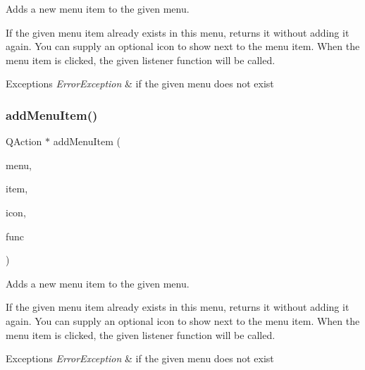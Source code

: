 Adds a new menu item to the given menu. 

If the given menu item already exists in this menu, returns it without adding it again. You can supply an optional icon to show next to the menu item. When the menu item is clicked, the given listener function will be called. 
\begin{DoxyExceptions}{Exceptions}
{\em Error\+Exception} & if the given menu does not exist \\
\hline
\end{DoxyExceptions}
\mbox{\label{classGWindow_a9c1d62659ac23b6752a59dc657c5140c}} 
\subsubsection{\texorpdfstring{add\+Menu\+Item()}{addMenuItem()}\hspace{0.1cm}{\footnotesize\ttfamily [3/4]}}
{\footnotesize\ttfamily Q\+Action $\ast$ add\+Menu\+Item (\begin{DoxyParamCaption}\item[{const std\+::string \&}]{menu,  }\item[{const std\+::string \&}]{item,  }\item[{const Q\+Icon \&}]{icon,  }\item[{G\+Event\+Listener\+Void}]{func }\end{DoxyParamCaption})\hspace{0.3cm}{\ttfamily [virtual]}}



Adds a new menu item to the given menu. 

If the given menu item already exists in this menu, returns it without adding it again. You can supply an optional icon to show next to the menu item. When the menu item is clicked, the given listener function will be called. 
\begin{DoxyExceptions}{Exceptions}
{\em Error\+Exception} & if the given menu does not exist \\
\hline
\end{DoxyExceptions}
\mbox{\label{classGWindow_a8452af11e9c36ac44dbdc4332095871e}} 
